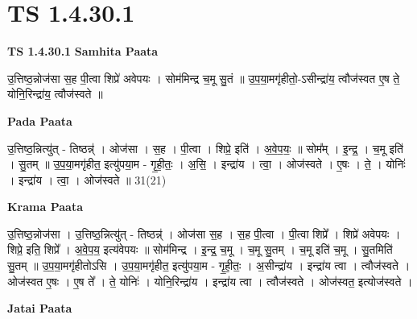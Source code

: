 \documentclass[17pt]{extarticle}
\begin{document}
\section*{ TS 1.4.30.1 }

\textbf{TS 1.4.30.1 } \newline
\textbf{Samhita Paata} \newline

उ॒त्तिष्ठ॒न्नोज॑सा स॒ह पी॒त्वा शिप्रे॑ अवेपयः । सोम॑मिन्द्र च॒मू सु॒तं ॥ उ॒प॒या॒मगृ॑हीतो॒-ऽसीन्द्रा॑य॒ त्वौज॑स्वत ए॒ष ते॒ योनि॒रिन्द्रा॑य॒ त्वौज॑स्वते ॥ \newline

\textbf{Pada Paata} \newline

उ॒त्तिष्ठ॒न्नित्यु॑त् - तिष्ठन्न्॑ । ओज॑सा । स॒ह । पी॒त्वा । शिप्रे॒ इति॑ । अ॒वे॒प॒यः॒ ॥ सोम᳚म् । इ॒न्द्र॒ । च॒मू इति॑ । सु॒तम् ॥ उ॒प॒या॒मगृ॑हीत॒ इत्यु॑पया॒म - गृ॒ही॒तः॒ । अ॒सि॒ । इन्द्रा॑य । त्वा॒ । ओज॑स्वते । ए॒षः । ते॒ । योनिः॑ । इन्द्रा॑य । त्वा॒ । ओज॑स्वते ॥ 31(21)  \newline


\textbf{Krama Paata} \newline

उ॒त्तिष्ठ॒न्नोज॑सा । उ॒त्तिष्ठ॒न्नित्यु॑त् - तिष्ठन्न्॑ । ओज॑सा स॒ह । स॒ह पी॒त्वा । पी॒त्वा शिप्रे᳚ । शिप्रे॑ अवेपयः । शिप्रे॒ इति॒ शिप्रे᳚ । अ॒वे॒प॒य॒ इत्य॑वेपयः ॥ सोम॑मिन्द्र । इ॒न्द्र॒ च॒मू । च॒मू सु॒तम् । च॒मू इति॑ च॒मू । सु॒तमिति॑ सु॒तम् ॥ उ॒प॒या॒मगृ॑हीतोऽसि । उ॒प॒या॒मगृ॑हीत॒ इत्यु॑पया॒म - गृ॒ही॒तः॒ । अ॒सीन्द्रा॑य । इन्द्रा॑य त्वा । त्वौज॑स्वते । ओज॑स्वत ए॒षः । ए॒ष ते᳚ । ते॒ योनिः॑ । योनि॒रिन्द्रा॑य । इन्द्रा॑य त्वा । त्वौज॑स्वते । ओज॑स्वत॒ इत्योज॑स्वते । \newline

\textbf{Jatai Paata} \newline
\end{document}
